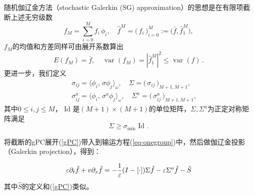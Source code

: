 随机伽辽金方法（stochastic Galerkin (SG) approximation）的思想是在有限项截断上述无穷级数
\begin{equation}
\label{gPC}
   f_M = \sum_{i=0}^{M} f_i \, \phi_i,  \quad  \hat f^M = \big(\, f_i \, \big)_{i=0}^M
   := \big(\bar f, \hat f_1^M\big),
\end{equation}
$f_M$的均值和方差同样可由展开系数算出
$$
   E (f_M) = \bar f, \quad \mbox{ var }(f_M) = |\hat f_1^M|^2 \le  \mbox{ var }(f)\,.
$$
更进一步，我们定义
\begin{eqnarray}
\nonumber
&& \sigma_{ij}= \big\langle \phi_i,\, \sigma \phi_j \big\rangle_\omega, \quad
\Sigma = \big( \,\sigma_{ij} \, \big)_{M+1, M+1}, \\
\nonumber
&& \sigma^a_{ij}= \big\langle \phi_i, \, \sigma^a \phi_j \big\rangle_\omega, \quad
\Sigma^a = \big(\, \sigma^a_{ij} \,\big)_{M+1, M+1},
\end{eqnarray}
其中$0\le i,j \le M$，$\mbox{ Id }$是$(M+1)\times (M+1)$的单位矩阵，$\Sigma, \Sigma^a$为正定对称矩阵满足
$$
\Sigma \ge \sigma_{\text{min}} \mbox{ Id }.
$$

将截断的gPC展开(\ref{gPC})带入到输运方程(\ref{eq-onegroup})中，然后做伽辽金投影（Galerkin projection），得到：

\begin{equation}\label{eq-gPC}
\varepsilon \partial_t \hat f + v \partial_x \hat f = - \frac{1}{\varepsilon}(I-[ \cdot ]) \Sigma  \hat f
-\varepsilon \Sigma^a \hat f - \hat S
\end{equation}
其中$\hat S$的定义和(\ref{gPC})类似。


